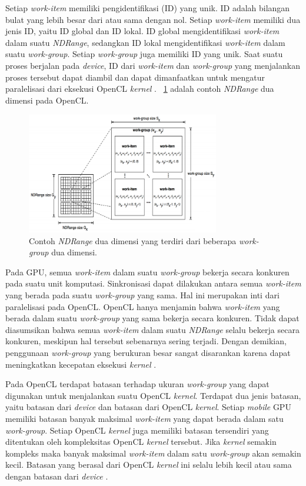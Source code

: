 Setiap \textit{work-item} memiliki pengidentifikasi (ID) yang unik. ID adalah bilangan bulat yang lebih besar dari atau sama dengan nol. Setiap \textit{work-item} memiliki dua jenis ID, yaitu ID global dan ID lokal. ID global mengidentifikasi \textit{work-item} dalam suatu \textit{NDRange}, sedangkan ID lokal mengidentifikasi \textit{work-item} dalam suatu \textit{work-group}. Setiap \textit{work-group} juga memiliki ID yang unik. Saat suatu proses berjalan pada \textit{device}, ID dari \textit{work-item} dan \textit{work-group} yang menjalankan proses tersebut dapat diambil dan dapat dimanfaatkan untuk mengatur paralelisasi dari eksekusi OpenCL \textit{kernel} \cite{opencl}. \pic~\ref{fig:work} adalah contoh \textit{NDRange} dua dimensi pada OpenCL.

\begin{figure}
	\centering
	\includegraphics[width=0.75\textwidth]
	{pics/opencl-work.png}
	\caption{Contoh \textit{NDRange} dua dimensi yang terdiri dari beberapa \textit{work-group} dua dimensi.}
	\label{fig:work}
\end{figure}

Pada GPU, semua \textit{work-item} dalam suatu \textit{work-group} bekerja secara konkuren pada suatu unit komputasi. Sinkronisasi dapat dilakukan antara semua \textit{work-item} yang berada pada suatu \textit{work-group} yang sama. Hal ini merupakan inti dari paralelisasi pada OpenCL. OpenCL hanya menjamin bahwa \textit{work-item} yang berada dalam suatu \textit{work-group} yang sama bekerja secara konkuren. Tidak dapat diasumsikan bahwa semua \textit{work-item} dalam suatu \textit{NDRange} selalu bekerja secara konkuren, meskipun hal tersebut sebenarnya sering terjadi. Dengan demikian, penggunaan \textit{work-group} yang berukuran besar sangat disarankan karena dapat meningkatkan kecepatan eksekusi \textit{kernel} \cite{openclguide}.

Pada OpenCL terdapat batasan terhadap ukuran \textit{work-group} yang dapat digunakan untuk menjalankan suatu OpenCL \textit{kernel}. Terdapat dua jenis batasan, yaitu batasan dari \textit{device} dan batasan dari OpenCL \textit{kernel}. Setiap \textit{mobile} GPU memiliki batasan banyak maksimal \textit{work-item} yang dapat berada dalam satu \textit{work-group}. Setiap OpenCL \textit{kernel} juga memiliki batasan tersendiri yang ditentukan oleh kompleksitas OpenCL \textit{kernel} tersebut. Jika \textit{kernel} semakin kompleks maka banyak maksimal \textit{work-item} dalam satu \textit{work-group} akan semakin kecil. Batasan yang berasal dari OpenCL \textit{kernel} ini selalu lebih kecil atau sama dengan batasan dari \textit{device} \cite{opencl}.


